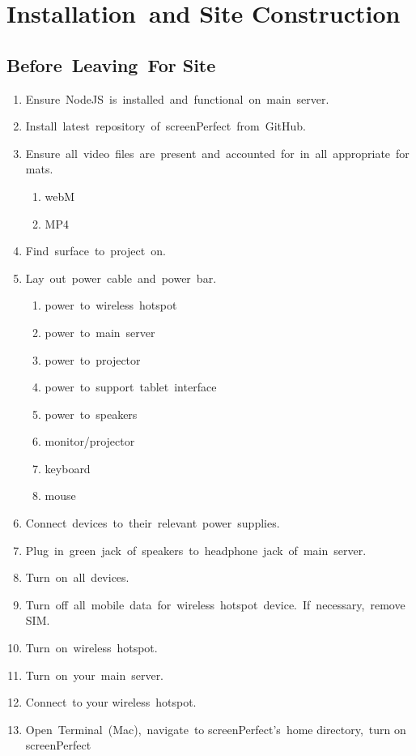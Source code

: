 \section{Installation and Site Construction}

\subsection{Before Leaving For Site}
\begin{enumerate}
\item{Ensure NodeJS is installed and functional on main server.}
\item{Install latest repository of screenPerfect from GitHub.}
\item{Ensure all video files are present and accounted for in all appropriate formats.}
	\begin{enumerate}
		\item{webM}
		\item{MP4}
	\end{enumerate}
\item{Find surface to project on.}
\item{Lay out power cable and power bar.}
	\begin{enumerate}
		\item{power to wireless hotspot}
		\item{power to main server}
		\item{power to projector}
		\item{power to support tablet interface}
		\item{power to speakers}
		\item{monitor/projector}
		\item{keyboard}
		\item{mouse}
	\end{enumerate}
\item{Connect devices to their relevant power supplies.}
\item{Plug in green jack of speakers to headphone jack of main server.}
\item{Turn on all devices.}
\item{Turn off all mobile data for wireless hotspot device. If necessary, remove SIM.}
\item{Turn on wireless hotspot.}
\item{Turn on your main server.}
\item{Connect to your wireless hotspot.}
\item{Open Terminal (Mac), navigate to screenPerfect’s home directory, turn on screenPerfect}

\end{enumerate}
